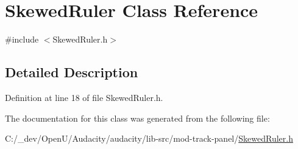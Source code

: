 \hypertarget{class_skewed_ruler}{}\section{Skewed\+Ruler Class Reference}
\label{class_skewed_ruler}


{\ttfamily \#include $<$Skewed\+Ruler.\+h$>$}



\subsection{Detailed Description}


Definition at line 18 of file Skewed\+Ruler.\+h.



The documentation for this class was generated from the following file\+:\begin{DoxyCompactItemize}
\item 
C\+:/\+\_\+dev/\+Open\+U/\+Audacity/audacity/lib-\/src/mod-\/track-\/panel/\hyperlink{_skewed_ruler_8h}{Skewed\+Ruler.\+h}\end{DoxyCompactItemize}
